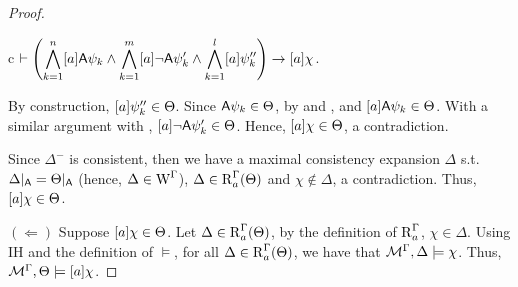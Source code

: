\begin{proof}
\begin{ctabular}{c}
$\vdash
\displaystyle
\left( \bigwedge_{k=1}^{n} [a]{\sf A}\psi_k \land \bigwedge_{k=1}^{m} [a]\lnot {\sf A}\psi'_k \land \bigwedge_{k=1}^{l} [a]\psi''_k \right)
\rightarrow [a] \chi$.
\end{ctabular}

By construction, $[a]\psi''_k \in \Theta$. Since ${\sf A}\psi_k \in \Theta$, by  and , and $[a]{\sf A}\psi_k \in \Theta$. With a similar argument with , $[a]\neg{\sf A}\psi'_k \in \Theta$.
Hence, $[a]\chi \in \Theta$, a contradiction.

Since $\Delta^-$ is consistent, then we have a maximal consistency expansion $\Delta$ s.t. $\Delta\vert_{{\sf A}} = \Theta\vert_{{\sf A}}$ (hence, $\Delta \in \operatorname{W}^\Gamma$), $\Delta \in \operatorname{R}^\Gamma_a(\Theta)$ and $\chi \notin \Delta$,
a contradiction. Thus, $[a]\chi \in \Theta$.

$(\Leftarrow)$ Suppose $[a]\chi \in \Theta$. Let $\Delta \in \operatorname{R}^\Gamma_a(\Theta)$, by the definition of $\operatorname{R}^\Gamma_a$, $\chi \in \Delta$.
Using IH and the definition of $\models$, for all $\Delta \in \operatorname{R}^\Gamma_a(\Theta)$, we have that $\mathcal{M}^\Gamma,\Delta \models \chi$.
Thus, $\mathcal{M}^\Gamma, \Theta \models [a]\chi$.
\medskip


\end{proof}

